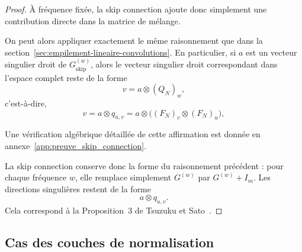 \begin{proof}
À fréquence fixée, la skip connection ajoute donc simplement une contribution directe dans la matrice
de mélange.

On peut alors appliquer exactement le même raisonnement que dans la section~\ref{sec:empilement-lineaire-convolutions}.
En particulier, si $a$ est un vecteur singulier droit de $G_{\mathrm{skip}}^{(w)}$, alors le vecteur singulier droit
correspondant dans l'espace complet reste de la forme
\[
v = a \otimes (Q_N)_w,
\]
c'est-à-dire,
\[
v
=
a \otimes q_{u,v}
=
a \otimes \bigl((F_N)_v \otimes (F_N)_u\bigr),
\]

Une vérification algébrique détaillée de cette affirmation est donnée en annexe~\ref{app:preuve_skip_connection}.

La skip connection conserve donc la forme du raisonnement précédent : pour chaque fréquence $w$,
elle remplace simplement $G^{(w)}$ par $G^{(w)}+I_m$. Les directions singulières restent de la forme
\[
    a\otimes q_{u,v}.
\]
Cela correspond à la Proposition~3 de Tsuzuku et Sato~\cite{tsuzuku2019structural}.

\end{proof}

\subsection{Cas des couches de normalisation}

